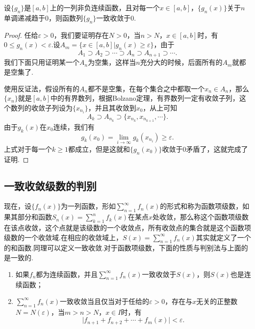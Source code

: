     \begin{theorem}[Dini定理]\label{thm:函数项级数:Dini定理}
        设\(\{g_n\}\)是\([a,b]\)上的一列非负连续函数，且对每一个\(x\in[a,b]\)，\enspace\(\{g_n(x)\}\)关于\(n\)单调递减趋于\(0\)，则函数列\(\{g_n\}\)一致收敛于\(0\).
    \end{theorem}
    \begin{proof}
        任给\(\varepsilon>0\)，我们要证明存在\(N>0\)，当\(n>N\)，\(x\in[a,b]\)时，有\(0\leq g_n(x)<\varepsilon\).设\(A_m = \{x\in[a,b]\vert g_n(x)\geq\varepsilon\}\)，由于\[A_1\supset A_2\supset\cdots\supset A_n\supset A_{n+1}\supset\cdots.\]我们下面只用证明某一个\(A_n\)为空集，这样当\(n\)充分大的时候，后面所有的\(A_m\)就都是空集了.

        使用反证法，假设所有的\(A_n\)都不是空集，在每个集合之中都取一个\(x_n\in A_n\)，那么\(\{x_n\}\)就是\([a,b]\)中的有界数列，根据Bolzano定理，有界数列一定有收敛子列，这个数列的收敛子列设为\(\{x_{n_i}\}\)，并且其收敛到\(x_0\)，从上可知\[A_k\supset A_{n_k}\supset\{x_{n_k},x_{n_{k+1}},\cdots\}.\]
        由于\(g_k(x)\)在\(x_0\)连续，我们有\[g_k(x_0)=\lim_{i\to\infty}g_k(x_{n_i})\geq\varepsilon.\]
        上式对于每一个\(k\geq 1\)都成立，但是这就和\(\{g_n(x_0)\}\)收敛于\(0\)矛盾了，这就完成了证明.
    \end{proof}


\subsection{一致收敛级数的判别}

    现在，设\(\{f_n(x)\}\)为一列函数，形如\(\sum\limits_{n=1}^{\infty}f_n(x)\)的形式和称为函数项级数，如果其部分和函数\(S_n(x) = \sum\limits_{k=1}^{n}f_k(x)\)在某点\(x\)处收敛，那么称这个函数项级数在该点收敛，这个点就是该级数的一个收敛点，所有收敛点的集合就是这个函数项级数的一个收敛域.在相应的收敛域上，\(S(x) = \sum\limits_{n=1}^{\infty}f_n(x)\)其实就定义了一个的{\heiti 和函数}.同理可以定义一致收敛.对于函数项级数，下面的性质与判别法与上面的是一致的.
    \begin{enumerate}
        \item 如果\(f_n\)都为连续函数，并且\(\sum\limits_{n=1}^{\infty}f_n(x)\)一致收敛于\(S(x)\)，则\(S(x)\)也是连续函数；
        \item \(\sum\limits_{n=1}^{\infty}f_n(x)\)一致收敛当且仅当对于任给的\(\varepsilon>0\)，存在与\(x\)无关的正整数\(N = N(\varepsilon)\)，当\(m>n>N\)，\enspace\(x\in I\)时，有\[\vert f_{n+1}+f_{n+2}+\cdots+f_{m}(x)\vert<\varepsilon.\]
    \end{enumerate}

